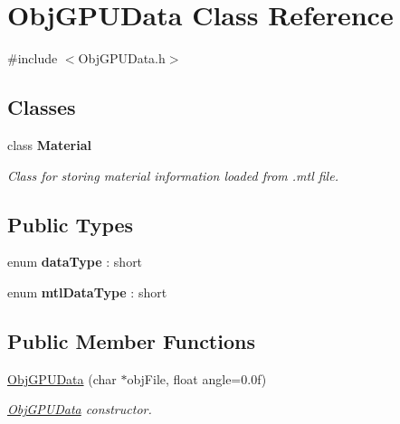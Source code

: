 \hypertarget{class_obj_g_p_u_data}{}\section{Obj\+G\+P\+U\+Data Class Reference}
\label{class_obj_g_p_u_data}


{\ttfamily \#include $<$Obj\+G\+P\+U\+Data.\+h$>$}

\subsection*{Classes}
\begin{DoxyCompactItemize}
\item 
class {\bfseries Material}
\begin{DoxyCompactList}\small\item\em Class for storing material information loaded from .mtl file. \end{DoxyCompactList}\end{DoxyCompactItemize}
\subsection*{Public Types}
\begin{DoxyCompactItemize}
\item 
enum {\bfseries data\+Type} \+: short \hypertarget{class_obj_g_p_u_data_a3f9703333cd44735587ec9538ee700c1}{}\label{class_obj_g_p_u_data_a3f9703333cd44735587ec9538ee700c1}

\item 
enum {\bfseries mtl\+Data\+Type} \+: short \hypertarget{class_obj_g_p_u_data_a1707d7430f8c5e15d6d059378414017c}{}\label{class_obj_g_p_u_data_a1707d7430f8c5e15d6d059378414017c}

\end{DoxyCompactItemize}
\subsection*{Public Member Functions}
\begin{DoxyCompactItemize}
\item 
\hyperlink{class_obj_g_p_u_data_aec4780be6075400b351e25e75716bad2}{Obj\+G\+P\+U\+Data} (char $\ast$obj\+File, float angle=0.\+0f)
\begin{DoxyCompactList}\small\item\em \hyperlink{class_obj_g_p_u_data}{Obj\+G\+P\+U\+Data} constructor. \end{DoxyCompactList}\end{DoxyCompactItemize}
